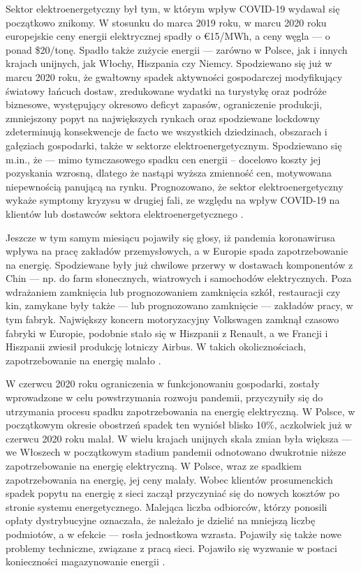 \documentclass[polish, twoside, 12pt, a4paper]{article}
\theoremstyle{definition}
\theoremstyle{plain}
\theoremstyle{remark}
\begin{document}
Sektor elektroenergetyczny był tym, w którym wpływ COVID-19 wydawał się początkowo znikomy. W stosunku do marca 2019 roku, w marcu 2020 roku europejskie ceny energii elektrycznej spadły o €15/MWh, a ceny węgla --- o ponad \$20/tonę. Spadło także zużycie energii --- zarówno w Polsce, jak i innych krajach unijnych, jak Włochy, Hiszpania czy Niemcy. Spodziewano się już w marcu 2020 roku, że gwałtowny spadek aktywności gospodarczej modyfikujący światowy łańcuch dostaw, zredukowane wydatki na turystykę oraz podróże biznesowe, występujący okresowo deficyt zapasów, ograniczenie produkcji, zmniejszony popyt na największych rynkach oraz spodziewane lockdowny zdeterminują konsekwencje de facto we wszystkich dziedzinach, obszarach i gałęziach gospodarki, także w sektorze elektroenergetycznym. Spodziewano się m.in., że --- mimo tymczasowego spadku cen energii – docelowo koszty jej pozyskania wzrosną, dlatego że nastąpi wyższa zmienność cen, motywowana niepewnością panującą na rynku. Prognozowano, że sektor elektroenergetyczny wykaże symptomy kryzysu w drugiej fali, ze względu na wpływ COVID-19 na klientów lub dostawców sektora elektroenergetycznego \citep{wajer2023}. 

Jeszcze w tym samym miesiącu pojawiły się głosy, iż pandemia koronawirusa wpływa na pracę zakładów przemysłowych, a w Europie spada zapotrzebowanie na energię. Spodziewane były już chwilowe przerwy w dostawach komponentów z Chin --- np. do farm słonecznych, wiatrowych i samochodów elektrycznych. Poza wdrażaniem zamknięcia lub prognozowaniem zamknięcia szkół, restauracji czy kin, zamykane były także --- lub prognozowano zamknięcie --- zakładów pracy, w tym fabryk. Największy koncern motoryzacyjny Volkswagen zamknął czasowo fabryki w Europie, podobnie stało się w Hiszpanii z Renault, a we Francji i Hiszpanii zwiesił produkcję lotniczy Airbus. W takich okolicznościach, zapotrzebowanie na energię malało \citep{wysokienapiecie2023}. 

W czerwcu 2020 roku ograniczenia w funkcjonowaniu gospodarki, zostały wprowadzone w celu powstrzymania rozwoju pandemii, przyczyniły się do utrzymania procesu spadku zapotrzebowania na energię elektryczną. W Polsce, w początkowym okresie obostrzeń spadek ten wyniósł blisko 10\%, aczkolwiek już w czerwcu 2020 roku malał. W wielu krajach unijnych skala zmian była większa --- we Włoszech w początkowym stadium pandemii odnotowano dwukrotnie niższe zapotrzebowanie na energię elektryczną. W Polsce, wraz ze spadkiem zapotrzebowania na energię, jej ceny malały. Wobec klientów prosumenckich spadek popytu na energię z sieci zaczął przyczyniać się do nowych kosztów po stronie systemu energetycznego. Malejąca liczba odbiorców, którzy ponosili opłaty dystrybucyjne oznaczała, że należało je dzielić na mniejszą liczbę podmiotów, a w efekcie --- rosła jednostkowa wzrasta. Pojawiły się także nowe problemy techniczne, związane z pracą sieci. Pojawiło się wyzwanie w postaci konieczności magazynowanie energii \citep{ure2023}.
\end{document}
